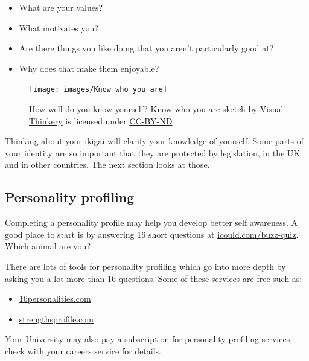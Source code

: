 \documentclass[
]{book}
\providecommand{\tightlist}{%
  \setlength{\itemsep}{0pt}\setlength{\parskip}{0pt}}
\begin{document}
\begin{itemize}
\tightlist
\item
  What are your values?
\item
  What motivates you?
\item
  Are there things you like doing that you aren't particularly good at?
\item
  Why does that make them enjoyable?
\end{itemize}

\begin{figure}

{\centering \texttt{[image: images/Know who you are]} 

}

\caption{How well do you know yourself? Know who you are sketch by \href{https://visualthinkery.com}{Visual Thinkery} is licensed under \href{https://creativecommons.org/licenses/by-nd/4.0/}{CC-BY-ND}}\label{fig:know-fig}
\end{figure}



Thinking about your ikigai will clarify your knowledge of yourself. Some parts of your identity are so important that they are protected by legislation, in the UK and in other countries. The next section looks at those.

\hypertarget{personality}{%
\subsection{Personality profiling}\label{personality}}

Completing a personality profile may help you develop better self awareness. A good place to start is by answering 16 short questions at \href{https://icould.com/buzz-quiz}{icould.com/buzz-quiz}. Which animal are you?

There are lots of tools for personality profiling which go into more depth by asking you a lot more than 16 questions. Some of these services are free such as:

\begin{itemize}
\tightlist
\item
  \href{https://www.16personalities.com}{16personalities.com}
\item
  \href{https://strengthsprofile.com/en-GB/Products/Free}{strengthsprofile.com}
\end{itemize}

Your University may also pay a subscription for personality profiling services, check with your careers service for details.
\end{document}
